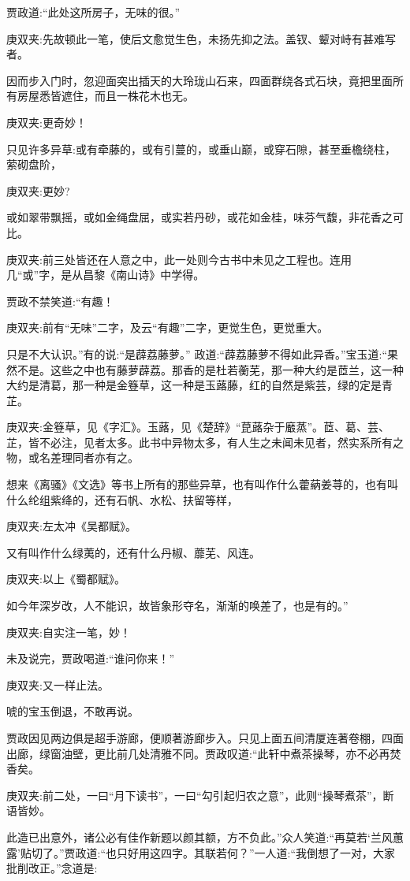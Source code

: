 \begin{parag}
    贾政道:“此处这所房子，无味的很。”\begin{note}庚双夹:先故顿此一笔，使后文愈觉生色，未扬先抑之法。盖钗、颦对峙有甚难写者。\end{note}因而步入门时，忽迎面突出插天的大玲珑山石来，四面群绕各式石块，竟把里面所有房屋悉皆遮住，而且一株花木也无。\begin{note}庚双夹:更奇妙！\end{note}只见许多异草:或有牵藤的，或有引蔓的，或垂山巅，或穿石隙，甚至垂檐绕柱，萦砌盘阶，\begin{note}庚双夹:更妙?\end{note}或如翠带飘摇，或如金绳盘屈，或实若丹砂，或花如金桂，味芬气馥，非花香之可比。\begin{note}庚双夹:前三处皆还在人意之中，此一处则今古书中未见之工程也。连用几“或”字，是从昌黎《南山诗》中学得。\end{note}贾政不禁笑道:“有趣！\begin{note}庚双夹:前有“无味”二字，及云“有趣”二字，更觉生色，更觉重大。\end{note}只是不大认识。”有的说:“是薜荔藤萝。” 政道:“薜荔藤萝不得如此异香。”宝玉道:“果然不是。这些之中也有藤萝薜荔。那香的是杜若蘅芜，那一种大约是茝兰，这一种大约是清葛，那一种是金簦草，这一种是玉蕗藤，红的自然是紫芸，绿的定是青芷。\begin{note}庚双夹:金簦草，见《字汇》。玉蕗，见《楚辞》“菎蕗杂于黀蒸”。茝、葛、芸、芷，皆不必注，见者太多。此书中异物太多，有人生之未闻未见者，然实系所有之物，或名差理同者亦有之。\end{note}想来《离骚》《文选》等书上所有的那些异草，也有叫作什么藿蒳姜荨的，也有叫什么纶组紫绛的，还有石帆、水松、扶留等样，\begin{note}庚双夹:左太冲《吴都赋》。\end{note}又有叫作什么绿荑的，还有什么丹椒、蘼芜、风连。\begin{note}庚双夹:以上《蜀都赋》。\end{note}如今年深岁改，人不能识，故皆象形夺名，渐渐的唤差了，也是有的。”\begin{note}庚双夹:自实注一笔，妙！\end{note}未及说完，贾政喝道:“谁问你来！”\begin{note}庚双夹:又一样止法。\end{note}唬的宝玉倒退，不敢再说。
\end{parag}


\begin{parag}
    贾政因见两边俱是超手游廊，便顺著游廊步入。只见上面五间清厦连著卷棚，四面出廊，绿窗油壁，更比前几处清雅不同。贾政叹道:“此轩中煮茶操琴，亦不必再焚香矣。\begin{note}庚双夹:前二处，一曰“月下读书”，一曰“勾引起归农之意”，此则“操琴煮茶”，断语皆妙。\end{note}此造已出意外，诸公必有佳作新题以颜其额，方不负此。”众人笑道:“再莫若‘兰风蕙露’贴切了。”贾政道:“也只好用这四字。其联若何？”一人道:“我倒想了一对，大家批削改正。”念道是:
\end{parag}


